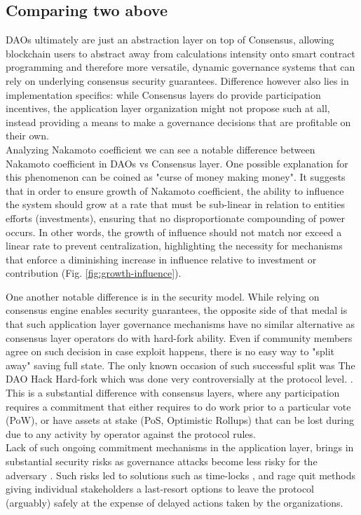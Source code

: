 \documentclass{article}
\begin{document}
\begin{CJK}{UTF8}{gbsn}
\begin{multicols}{2}
        \subsection{Comparing two above}
        DAOs ultimately are just an abstraction layer on top of Consensus, allowing blockchain users to abstract away from calculations intensity onto smart contract programming and therefore more versatile, dynamic governance systems that can rely on underlying consensus security guarantees. Difference however also lies in implementation specifics: while Consensus layers do provide participation incentives, the application layer organization might not propose such at all, instead providing a means to make a governance decisions that are profitable on their own. \\ Analyzing  Nakamoto coefficient we can see a notable difference between Nakamoto coefficient in DAOs vs Consensus layer. One possible explanation for this phenomenon can be coined as "curse of money making money". It suggests that in order to ensure growth of Nakamoto coefficient, the ability to influence the system should grow at a rate that must be sub-linear in relation to entities efforts (investments), ensuring that no disproportionate compounding of power occurs. In other words, the growth of influence should not match nor exceed a linear rate to prevent centralization, highlighting the necessity for mechanisms that enforce a diminishing increase in influence relative to investment or contribution (Fig. \ref*{fig:growth-influence}).

        One another notable difference is in the security model. While relying on consensus engine enables security guarantees, the opposite side of that medal is that such application layer governance mechanisms have no similar alternative as consensus layer operators do with hard-fork ability. Even if community members agree on such decision in case exploit happens, there is no easy way to "split away" saving full state. The only known occasion of such successful split was The DAO Hack Hard-fork which was done very controversially at the protocol level.  \cite{Liu2021}.
        This is a substantial difference with consensus layers, where any participation requires a commitment that either requires to do work prior to a particular vote (PoW), or have assets at stake (PoS, Optimistic Rollups) that can be lost during due to any activity by operator against the protocol rules.\\
        Lack of such ongoing commitment mechanisms in the application layer, brings in substantial security risks as governance attacks become less risky for the adversary \cite{AragonBlog}\cite{rhizoo2023}. Such risks led to solutions such as time-locks \cite{Jack2021}, and rage quit \cite{Ameen2019} methods giving individual stakeholders a last-resort options to leave the protocol (arguably) safely at the expense of delayed actions taken by the organizations.


\end{multicols}
\end{CJK}
\end{document}
